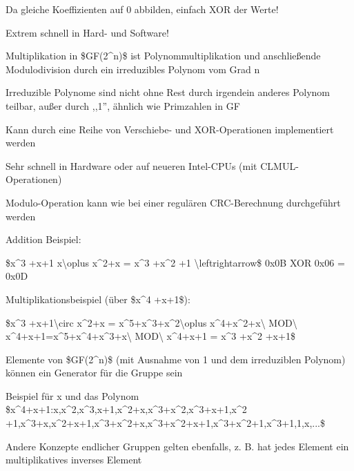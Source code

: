 \documentclass[a4paper]{article}
\begin{document}
\begin{multicols}{3}
\begin{itemize*}
            \begin{itemize*}
                  \item Da gleiche Koeffizienten auf 0 abbilden, einfach XOR der Werte!
                  \item Extrem schnell in Hard- und Software!
            \end{itemize*}
            \item
            Multiplikation in \$GF(2\^{}n)\$ ist Polynommultiplikation und
            anschließende Modulodivision durch ein irreduzibles Polynom vom Grad n

            \begin{itemize*}
                  \item Irreduzible Polynome sind nicht ohne Rest durch irgendein anderes Polynom teilbar, außer durch ,,1'', ähnlich wie Primzahlen in GF
                  \item Kann durch eine Reihe von Verschiebe- und XOR-Operationen implementiert werden
                  \item Sehr schnell in Hardware oder auf neueren Intel-CPUs (mit CLMUL-Operationen)
                  \item Modulo-Operation kann wie bei einer regulären CRC-Berechnung durchgeführt werden
            \end{itemize*}
            \item
            Addition Beispiel:

            \begin{itemize*}
                  \item \$x\^{}3 +x+1 x\textbackslash oplus x\^{}2+x = x\^{}3 +x\^{}2 +1 \textbackslash leftrightarrow\$ 0x0B XOR 0x06 = 0x0D
            \end{itemize*}
            \item
            Multiplikationsbeispiel (über \$x\^{}4 +x+1\$):

            \begin{itemize*}
                  \item \$x\^{}3 +x+1\textbackslash circ x\^{}2+x = x\^{}5+x\^{}3+x\^{}2\textbackslash oplus x\^{}4+x\^{}2+x\textbackslash{} MOD\textbackslash{} x\^{}4+x+1=x\^{}5+x\^{}4+x\^{}3+x\textbackslash{} MOD\textbackslash{} x\^{}4+x+1 = x\^{}3 +x\^{}2 +x+1\$
            \end{itemize*}
            \item
            Elemente von \$GF(2\^{}n)\$ (mit Ausnahme von 1 und dem irreduziblen
            Polynom) können ein Generator für die Gruppe sein
            \item
            Beispiel für x und das Polynom
            \$x\^{}4+x+1:x,x\^{}2,x\^{}3,x+1,x\^{}2+x,x\^{}3+x\^{}2,x\^{}3+x+1,x\^{}2
            +1,x\^{}3+x,x\^{}2+x+1,x\^{}3+x\^{}2+x,x\^{}3+x\^{}2+x+1,x\^{}3+x\^{}2+1,x\^{}3+1,1,x,...\$
            \item
            Andere Konzepte endlicher Gruppen gelten ebenfalls, z. B. hat jedes
            Element ein multiplikatives inverses Element


\end{itemize*}
\end{multicols}
\end{document}
